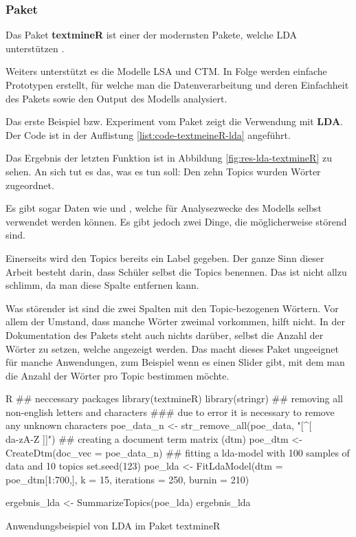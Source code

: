 \subsubsection{Paket }

Das Paket \textbf{textmineR} ist einer der modernsten Pakete, welche LDA unterstützen \cite[288]{Wiedemann2022-tm-R}.

Weiters unterstützt es die Modelle LSA und CTM. In Folge werden einfache Prototypen erstellt, für welche man die Datenverarbeitung und deren Einfachheit des Pakets sowie den Output des Modells analysiert.

Das erste Beispiel bzw. Experiment vom Paket  zeigt die Verwendung mit \textbf{LDA}. Der Code ist in der Auflistung \ref{list:code-textmeineR-lda} angeführt.

Das Ergebnis der letzten Funktion  ist in Abbildung \ref{fig:res-lda-textmineR} zu sehen. An sich tut es das, was es tun soll: Den zehn Topics wurden Wörter zugeordnet. 

Es gibt sogar Daten wie  und , welche für Analysezwecke des Modells selbst verwendet werden können. Es gibt jedoch zwei Dinge, die möglicherweise störend sind.

Einerseits wird den Topics bereits ein Label gegeben. Der ganze Sinn dieser Arbeit besteht darin, dass Schüler selbst die Topics benennen. Das ist nicht allzu schlimm, da man diese Spalte entfernen kann.

Was störender ist sind die zwei Spalten mit den Topic-bezogenen Wörtern. Vor allem der Umstand, dass manche Wörter zweimal vorkommen, hilft nicht. In der Dokumentation des Pakets  steht auch nichts darüber, selbst die Anzahl der Wörter zu setzen, welche angezeigt werden. Das macht dieses Paket ungeeignet für manche Anwendungen, zum Beispiel wenn es einen Slider gibt, mit dem man die Anzahl der Wörter pro Topic bestimmen möchte.

\begin{listing}
    \begin{code}{R}
        ## neccessary packages
        library(textmineR)
        library(stringr)
        ## removing all non-english letters and characters
        ### due to error it is necessary to remove any unknown characters
        poe_data_n <- str_remove_all(poe_data, "[^[\\da-zA-Z ]]")
        ## creating a document term matrix (dtm)
        poe_dtm <- CreateDtm(doc_vec = poe_data_n)
        ## fitting a lda-model with 100 samples of data and 10 topics
        set.seed(123)
        poe_lda <- FitLdaModel(dtm = poe_dtm[1:700,], k = 15, iterations = 250, burnin = 210)

        ergebnis_lda <- SummarizeTopics(poe_lda)
        ergebnis_lda
    \end{code}
    \caption{Anwendungsbeispiel von LDA im Paket textmineR}
    \label{list:code-textmeineR-lda}
\end{listing}

